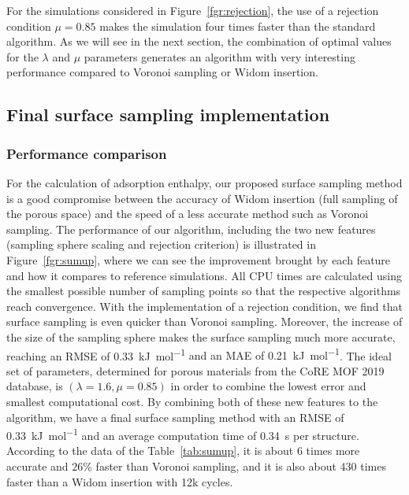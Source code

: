 \documentclass[main]{subfiles}
\begin{document}
For the simulations considered in Figure~\ref{fgr:rejection}, the use of a rejection condition $\mu = 0.85$ makes the simulation four times faster than the standard algorithm. As we will see in the next section, the combination of optimal values for the $\lambda$ and $\mu$ parameters generates an algorithm with very interesting performance compared to Voronoi sampling or Widom insertion.


\subsection{Final surface sampling implementation}\label{sct:final_sampling}

\subsubsection{Performance comparison}

For the calculation of adsorption enthalpy, our proposed surface sampling method is a good compromise between the accuracy of Widom insertion (full sampling of the porous space) and the speed of a less accurate method such as Voronoi sampling. The performance of our algorithm, including the two new features (sampling sphere scaling and rejection criterion) is illustrated in Figure~\ref{fgr:sumup}, where we can see the improvement brought by each feature and how it compares to reference simulations. All CPU times are calculated using the smallest possible number of sampling points so that the respective algorithms reach convergence. With the implementation of a rejection condition, we find that surface sampling is even quicker than Voronoi sampling. Moreover, the increase of the size of the sampling sphere makes the surface sampling much more accurate, reaching an RMSE of \SI{0.33}{\kilo\joule\per\mole} {and an MAE of \SI{0.21}{\kilo\joule\per\mole}}. The ideal set of parameters, determined for porous materials from the CoRE MOF 2019 database, is $(\lambda = 1.6, \mu = 0.85)$ in order to combine the lowest error and smallest computational cost. By combining both of these new features to the algorithm, we have a final surface sampling method with an RMSE of \SI{0.33}{\kilo\joule\per\mole} and an average computation time of \SI{0.34}{\second} per structure. According to the data of the Table~\ref{tab:sumup}, it is about 6 times more accurate and {$26$\%} faster than Voronoi sampling, and it is also about 430 times faster than a Widom insertion with 12k cycles.
\end{document}
